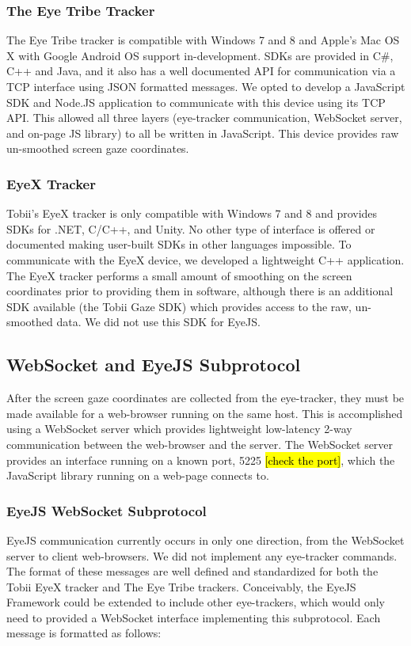 \documentclass{sigchi}
\begin{document}
\subsubsection{The Eye Tribe Tracker}
The Eye Tribe tracker is compatible with Windows 7 and 8 and Apple's Mac
OS X with Google Android OS support in-development. SDKs are provided
in C\#, C++ and Java, and it also has a well documented API for
communication via a TCP interface using JSON formatted messages. We
opted to develop a JavaScript SDK and Node.JS application to communicate
with this device using its TCP API. This allowed all three layers
(eye-tracker communication, WebSocket server, and on-page JS library)
to all be written in JavaScript. This device provides raw un-smoothed
screen gaze coordinates.


\subsubsection{EyeX Tracker}
Tobii's EyeX tracker is only compatible with Windows 7 and 8 and provides
SDKs for .NET, C/C++, and Unity. No other type of interface is offered
or documented making user-built SDKs in other languages impossible. To communicate with the EyeX device, we developed a lightweight C++
application. The EyeX tracker performs a small amount of smoothing on the
screen coordinates prior to providing them in software, although there
is an additional SDK available (the Tobii Gaze SDK) which provides access
to the raw, un-smoothed data. We did not use this SDK for EyeJS.


\subsection{WebSocket and EyeJS Subprotocol}
After the screen gaze coordinates are collected from the eye-tracker,
they must be made available for a web-browser running on the same host.
This is accomplished using a WebSocket server which provides lightweight
low-latency 2-way communication between the web-browser and the server.
The WebSocket server provides an interface running on a known port, 5225 \hl{[check the port]}, which the JavaScript library running on a web-page
connects to.

\subsubsection{EyeJS WebSocket Subprotocol}
EyeJS communication currently occurs in only one direction, from
the WebSocket server to client web-browsers. We did not implement
any eye-tracker commands. The format of these messages are well
defined and standardized
for both the Tobii EyeX tracker and The Eye Tribe trackers. Conceivably,
the EyeJS Framework could be extended to include other eye-trackers,
which would only need to provided a WebSocket interface implementing
this subprotocol. Each message is formatted as follows:
\end{document}
